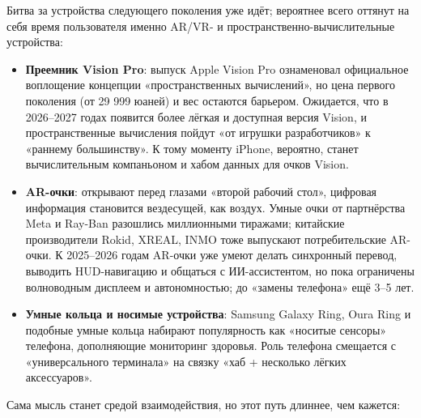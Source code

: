 


Битва за устройства следующего поколения уже идёт; вероятнее всего оттянут на себя время пользователя именно AR/VR- и пространственно-вычислительные устройства:

\begin{itemize}
  \item \textbf{Преемник Vision Pro}: выпуск Apple Vision Pro ознаменовал официальное воплощение концепции «пространственных вычислений», но цена первого поколения (от 29 999 юаней) и вес остаются барьером. Ожидается, что в 2026–2027 годах появится более лёгкая и доступная версия Vision, и пространственные вычисления пойдут «от игрушки разработчиков» к «раннему большинству». К тому моменту iPhone, вероятно, станет вычислительным компаньоном и хабом данных для очков Vision.
  \item \textbf{AR-очки}: открывают перед глазами «второй рабочий стол», цифровая информация становится вездесущей, как воздух. Умные очки от партнёрства Meta и Ray-Ban разошлись миллионными тиражами; китайские производители Rokid, XREAL, INMO тоже выпускают потребительские AR-очки. К 2025–2026 годам AR-очки уже умеют делать синхронный перевод, выводить HUD-навигацию и общаться с ИИ-ассистентом, но пока ограничены волноводным дисплеем и автономностью; до «замены телефона» ещё 3–5 лет.
  \item \textbf{Умные кольца и носимые устройства}: Samsung Galaxy Ring, Oura Ring и подобные умные кольца набирают популярность как «носитые сенсоры» телефона, дополняющие мониторинг здоровья. Роль телефона смещается с «универсального терминала» на связку «хаб + несколько лёгких аксессуаров».
\end{itemize}


Сама мысль станет средой взаимодействия, но этот путь длиннее, чем кажется:

